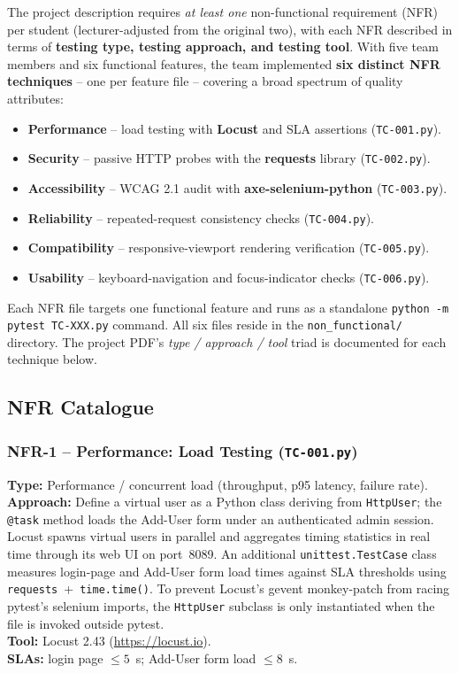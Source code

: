 \documentclass[twoside,final]{hcmut-report}
\begin{document}
The project description requires \emph{at least one} non-functional requirement (NFR) per student (lecturer-adjusted from the original two), with each NFR described in terms of \textbf{testing type, testing approach, and testing tool}. With five team members and six functional features, the team implemented \textbf{six distinct NFR techniques} -- one per feature file -- covering a broad spectrum of quality attributes:
\begin{itemize}
    \item \textbf{Performance} -- load testing with \textbf{Locust} and SLA assertions (\texttt{TC-001.py}).
    \item \textbf{Security} -- passive HTTP probes with the \textbf{requests} library (\texttt{TC-002.py}).
    \item \textbf{Accessibility} -- WCAG 2.1 audit with \textbf{axe-selenium-python} (\texttt{TC-003.py}).
    \item \textbf{Reliability} -- repeated-request consistency checks (\texttt{TC-004.py}).
    \item \textbf{Compatibility} -- responsive-viewport rendering verification (\texttt{TC-005.py}).
    \item \textbf{Usability} -- keyboard-navigation and focus-indicator checks (\texttt{TC-006.py}).
\end{itemize}

Each NFR file targets one functional feature and runs as a standalone \texttt{python -m pytest TC-XXX.py} command. All six files reside in the \texttt{non\_functional/} directory. The project PDF's \emph{type / approach / tool} triad is documented for each technique below.

\subsection{NFR Catalogue}

\subsubsection{NFR-1 -- Performance: Load Testing (\texttt{TC-001.py})}
\textbf{Type:} Performance / concurrent load (throughput, p95 latency, failure rate).\\
\textbf{Approach:} Define a virtual user as a Python class deriving from \texttt{HttpUser}; the \texttt{@task} method loads the Add-User form under an authenticated admin session. Locust spawns virtual users in parallel and aggregates timing statistics in real time through its web UI on port~8089. An additional \texttt{unittest.TestCase} class measures login-page and Add-User form load times against SLA thresholds using \texttt{requests}~+~\texttt{time.time()}. To prevent Locust's gevent monkey-patch from racing pytest's selenium imports, the \texttt{HttpUser} subclass is only instantiated when the file is invoked outside pytest.\\
\textbf{Tool:} Locust 2.43 (\url{https://locust.io}).\\
\textbf{SLAs:} login page $\leq 5$~s; Add-User form load $\leq 8$~s.
\end{document}

